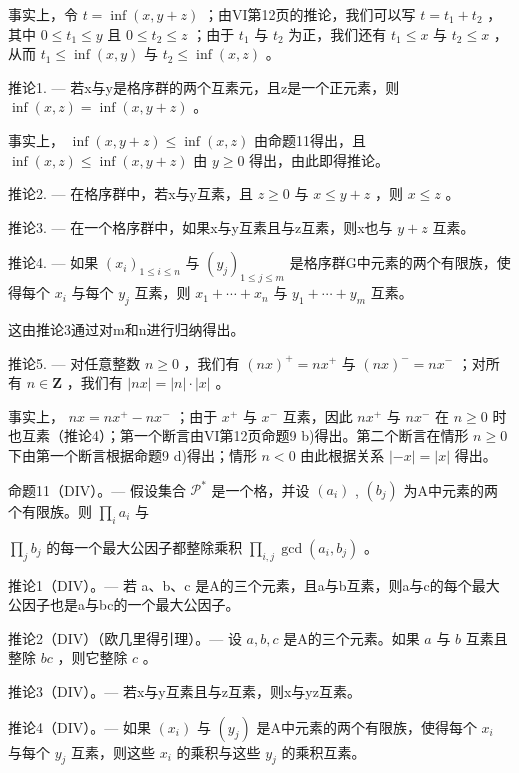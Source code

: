 事实上，令 \(t = \inf(x, y + z)\) ；由VI第12页的推论，我们可以写 \(t = t_1 + t_2\) ，其中 \(0 \leqslant t_1 \leqslant y\) 且 \(0 \leqslant t_2 \leqslant z\) ；由于 \(t_1\) 与 \(t_2\) 为正，我们还有 \(t_1 \leqslant x\) 与 \(t_2 \leqslant x\) ，从而 \(t_1 \leqslant \inf(x, y)\) 与 \(t_2 \leqslant \inf(x, z)\) 。

推论1. --- 若x与y是格序群的两个互素元，且z是一个正元素，则 \(\inf(x, z) = \inf(x, y + z)\) 。

事实上， \(\inf (x,y + z)\leqslant \inf (x,z)\) 由命题11得出，且 \(\inf (x,z)\leqslant \inf (x,y + z)\) 由 \(y\geqslant 0\) 得出，由此即得推论。

推论2. --- 在格序群中，若x与y互素，且 \(z \geqslant 0\) 与 \(x \leqslant y + z\) ，则 \(x \leqslant z\) 。

推论3. --- 在一个格序群中，如果x与y互素且与z互素，则x也与 \(y + z\) 互素。

推论4. --- 如果 \((x_i)_{1 \leq i \leq n}\) 与 \((y_j)_{1 \leq j \leq m}\) 是格序群G中元素的两个有限族，使得每个 \(x_i\) 与每个 \(y_j\) 互素，则 \(x_1 + \cdots + x_n\) 与 \(y_1 + \cdots + y_m\) 互素。

这由推论3通过对m和n进行归纳得出。

推论5. --- 对任意整数 \(n \geqslant 0\) ，我们有 \((nx)^+ = nx^+\) 与 \((nx)^- = nx^-\) ；对所有 \(n \in \mathbf{Z}\) ，我们有 \(|nx| = |n| \cdot |x|\) 。

事实上， \(nx = nx^{+} - nx^{-}\) ；由于 \(x^{+}\) 与 \(x^{-}\) 互素，因此 \(nx^{+}\) 与 \(nx^{-}\) 在 \(n \geqslant 0\) 时也互素（推论4）；第一个断言由VI第12页命题9 b)得出。第二个断言在情形 \(n \geqslant 0\) 下由第一个断言根据命题9 d)得出；情形 \(n < 0\) 由此根据关系 \(|-x| = |x|\) 得出。

命题11（DIV）。--- 假设集合 \(\mathcal{P}^*\) 是一个格，并设 \((a_i)\) , \((b_j)\) 为A中元素的两个有限族。则 \(\prod_{i} a_i\) 与

\(\prod_{j} b_{j}\) 的每一个最大公因子都整除乘积 \(\prod_{i,j} \gcd(a_{i}, b_{j})\) 。

推论1（DIV）。--- 若 a、b、c 是A的三个元素，且a与b互素，则a与c的每个最大公因子也是a与bc的一个最大公因子。

推论2（DIV）（欧几里得引理）。--- 设 \(a, b, c\) 是A的三个元素。如果 \(a\) 与 \(b\) 互素且整除 \(bc\) ，则它整除 \(c\) 。

推论3（DIV）。--- 若x与y互素且与z互素，则x与yz互素。

推论4（DIV）。--- 如果 \((x_{i})\) 与 \((y_{j})\) 是A中元素的两个有限族，使得每个 \(x_{i}\) 与每个 \(y_{j}\) 互素，则这些 \(x_{i}\) 的乘积与这些 \(y_{j}\) 的乘积互素。

